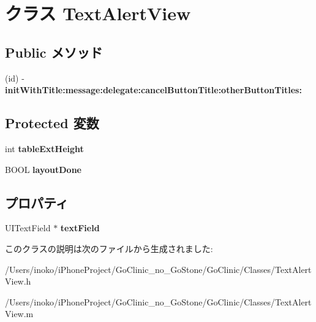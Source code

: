 \hypertarget{interface_text_alert_view}{
\section{クラス TextAlertView}
\label{interface_text_alert_view}
}
\subsection*{Public メソッド}
\begin{DoxyCompactItemize}
\item 
\hypertarget{interface_text_alert_view_a258d1de3963d12f8f8be71cd554b59fc}{
(id) -\/ {\bfseries initWithTitle:message:delegate:cancelButtonTitle:otherButtonTitles:}}
\label{interface_text_alert_view_a258d1de3963d12f8f8be71cd554b59fc}

\end{DoxyCompactItemize}
\subsection*{Protected 変数}
\begin{DoxyCompactItemize}
\item 
\hypertarget{interface_text_alert_view_a7a2fe6109b41d98c957933207bbe3b21}{
int {\bfseries tableExtHeight}}
\label{interface_text_alert_view_a7a2fe6109b41d98c957933207bbe3b21}

\item 
\hypertarget{interface_text_alert_view_a5facf7c2d58edfbe9f87de62525958d7}{
BOOL {\bfseries layoutDone}}
\label{interface_text_alert_view_a5facf7c2d58edfbe9f87de62525958d7}

\end{DoxyCompactItemize}
\subsection*{プロパティ}
\begin{DoxyCompactItemize}
\item 
\hypertarget{interface_text_alert_view_a466338b8508aa5d97a1f2d8b39f1768e}{
UITextField $\ast$ {\bfseries textField}}
\label{interface_text_alert_view_a466338b8508aa5d97a1f2d8b39f1768e}

\end{DoxyCompactItemize}


このクラスの説明は次のファイルから生成されました:\begin{DoxyCompactItemize}
\item 
/Users/inoko/iPhoneProject/GoClinic\_\-no\_\-GoStone/GoClinic/Classes/TextAlertView.h\item 
/Users/inoko/iPhoneProject/GoClinic\_\-no\_\-GoStone/GoClinic/Classes/TextAlertView.m\end{DoxyCompactItemize}
